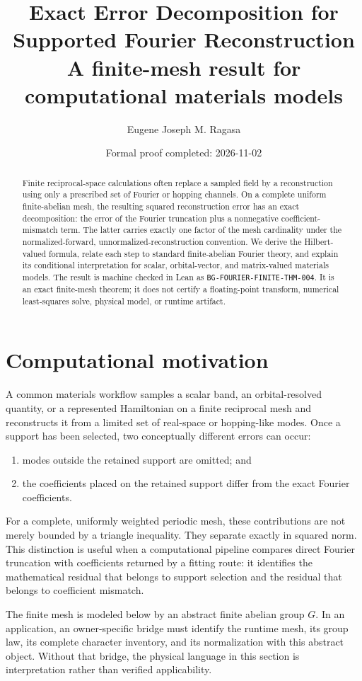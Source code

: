 \documentclass[11pt]{article}
\title{Exact Error Decomposition for Supported Fourier Reconstruction\\
\large A finite-mesh result for computational materials models}
\author{Eugene Joseph M. Ragasa}
\date{Formal proof completed: 2026-11-02}
\begin{document}
\maketitle

\begin{abstract}
Finite reciprocal-space calculations often replace a sampled field by a reconstruction using only
a prescribed set of Fourier or hopping channels.  On a complete uniform finite-abelian mesh, the
resulting squared reconstruction error has an exact decomposition: the error of the Fourier
truncation plus a nonnegative coefficient-mismatch term.  The latter carries exactly one factor of
the mesh cardinality under the normalized-forward, unnormalized-reconstruction convention.  We
derive the Hilbert-valued formula, relate each step to standard finite-abelian Fourier theory, and
explain its conditional interpretation for scalar, orbital-vector, and matrix-valued materials
models.  The result is machine checked in Lean as
\texttt{BG-FOURIER-FINITE-THM-004}.  It is an exact finite-mesh theorem; it does not certify a
floating-point transform, numerical least-squares solve, physical model, or runtime artifact.
\end{abstract}

\section{Computational motivation}
A common materials workflow samples a scalar band, an orbital-resolved quantity, or a represented
Hamiltonian on a finite reciprocal mesh and reconstructs it from a limited set of real-space or
hopping-like modes.  Once a support has been selected, two conceptually different errors can occur:
\begin{enumerate}
  \item modes outside the retained support are omitted; and
  \item the coefficients placed on the retained support differ from the exact Fourier
        coefficients.
\end{enumerate}
For a complete, uniformly weighted periodic mesh, these contributions are not merely bounded by a
triangle inequality.  They separate exactly in squared norm.  This distinction is useful when a
computational pipeline compares direct Fourier truncation with coefficients returned by a fitting
route: it identifies the mathematical residual that belongs to support selection and the residual
that belongs to coefficient mismatch.

The finite mesh is modeled below by an abstract finite abelian group $G$.  In an application, an
owner-specific bridge must identify the runtime mesh, its group law, its complete character
inventory, and its normalization with this abstract object.  Without that bridge, the physical
language in this section is interpretation rather than verified applicability.
\end{document}
